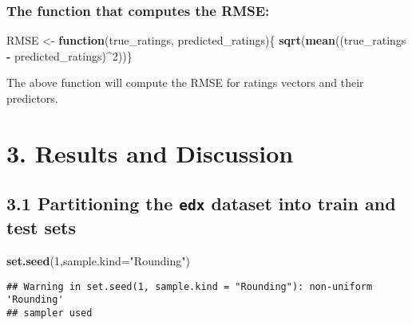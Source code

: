 \documentclass[]{article}
\newenvironment{Shaded}{\begin{snugshade}}{\end{snugshade}}
\newcommand{\ControlFlowTok}[1]{\textcolor[rgb]{0.13,0.29,0.53}{\textbf{#1}}}
\newcommand{\DataTypeTok}[1]{\textcolor[rgb]{0.13,0.29,0.53}{#1}}
\newcommand{\DecValTok}[1]{\textcolor[rgb]{0.00,0.00,0.81}{#1}}
\newcommand{\KeywordTok}[1]{\textcolor[rgb]{0.13,0.29,0.53}{\textbf{#1}}}
\newcommand{\NormalTok}[1]{#1}
\newcommand{\OperatorTok}[1]{\textcolor[rgb]{0.81,0.36,0.00}{\textbf{#1}}}
\newcommand{\StringTok}[1]{\textcolor[rgb]{0.31,0.60,0.02}{#1}}
\begin{document}
\hypertarget{the-function-that-computes-the-rmse}{%
\subsubsection{The function that computes the
RMSE:}\label{the-function-that-computes-the-rmse}}

\begin{Shaded}
\begin{Highlighting}[]
\NormalTok{RMSE <-}\StringTok{ }\ControlFlowTok{function}\NormalTok{(true_ratings, predicted_ratings)\{ }\KeywordTok{sqrt}\NormalTok{(}\KeywordTok{mean}\NormalTok{((true_ratings }\OperatorTok{-}\StringTok{ }\NormalTok{predicted_ratings)}\OperatorTok{^}\DecValTok{2}\NormalTok{))\}}
\end{Highlighting}
\end{Shaded}

The above function will compute the RMSE for ratings vectors and their
predictors.

\hypertarget{results-and-discussion-1}{%
\section{3. Results and Discussion}\label{results-and-discussion-1}}

\hypertarget{partitioning-the-edx-dataset-into-train-and-test-sets-1}{%
\subsection{\texorpdfstring{3.1 Partitioning the \texttt{edx} dataset
into train and test
sets}{3.1 Partitioning the edx dataset into train and test sets}}\label{partitioning-the-edx-dataset-into-train-and-test-sets-1}}

\begin{Shaded}
\begin{Highlighting}[]
\KeywordTok{set.seed}\NormalTok{(}\DecValTok{1}\NormalTok{,}\DataTypeTok{sample.kind=}\StringTok{"Rounding"}\NormalTok{)}
\end{Highlighting}
\end{Shaded}

\begin{verbatim}
## Warning in set.seed(1, sample.kind = "Rounding"): non-uniform 'Rounding'
## sampler used
\end{verbatim}
\end{document}
